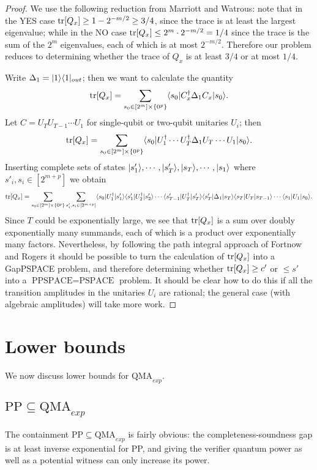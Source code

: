 \documentclass[english]{article}
\numberwithin{equation}{section}
\numberwithin{figure}{section}
\theoremstyle{plain}
\theoremstyle{definition}
\theoremstyle{plain}
\theoremstyle{definition}
\theoremstyle{remark}
\theoremstyle{remark}
\theoremstyle{plain}
\begin{document}
\begin{proof}
We use the following reduction from Marriott and Watrous: note that in the YES case $\operatorname{tr}[Q_x]\ge 1 - 2^{-m/2} \ge 3/4$, since the trace is at least the largest eigenvalue; while in the NO case $\operatorname{tr}[Q_x]\le 2^m \cdot 2^{-m/2} =1/4$ since the trace is the sum of the $2^m$ eigenvalues, each of which is at most $2^{-m/2}$. Therefore our problem reduces to determining whether the trace of $Q_x$ is at least $3/4$ or at most $1/4$.

Write $\Delta_1 = |1\rangle\langle 1|_{out}$; then we want to calculate the quantity
\begin{equation}
\operatorname{tr}[Q_x] = \sum_{s_0 \in [2^m] \times \{0^p\}} \langle s_0| C^\dagger_x \Delta_1 C_x |s_0\rangle.
\end{equation}
Let $C = U_TU_{T-1}\cdots U_1$ for single-qubit or two-qubit unitaries $U_i$; then
\begin{equation}
\operatorname{tr}[Q_x] = \sum_{s_0 \in [2^m] \times \{0^p\}} \langle s_0| U_1^\dagger \cdots U_T^\dagger \Delta_1 U_T\cdots U_1 |s_0\rangle.
\end{equation}
Inserting complete sets of states $|s'_1\rangle,\cdots,|s'_T\rangle,|s_T\rangle,\cdots,|s_1\rangle$ where $s'_i,s_i \in [2^{m+p}]$ we obtain
\begin{equation}
\operatorname{tr}[Q_x] = \sum_{s_0 \in [2^m] \times \{0^p\}} \sum_{s'_i,s_i \in [2^{m+p}]} \langle s_0| U_1^\dagger |s'_1\rangle\langle s'_1|U_2^\dagger|s'_2\rangle \cdots \langle s'_{T-1}|U_T^\dagger|s'_T\rangle \langle s'_T|\Delta_1 |s_T\rangle\langle s_T|U_T|s_{T-1}\rangle\cdots \langle s_1|U_1 |s_0\rangle.
\end{equation}
Since $T$ could be exponentially large, we see that $\operatorname{tr}[Q_x]$ is a sum over doubly exponentially many summands, each of which is a product over exponentially many factors. Nevertheless, by following the path integral approach of Fortnow and Rogers it should be possible to turn the calculation of $\operatorname{tr}[Q_x]$ into a GapPSPACE problem, and therefore determining whether $\operatorname{tr}[Q_x] \ge c'$ or $\le s'$ into a $\text{PPSPACE} = \text{PSPACE}$ problem. It should be clear how to do this if all the transition amplitudes in the unitaries $U_i$ are rational; the general case (with algebraic amplitudes) will take more work.

\end{proof}

\section{Lower bounds}
We now discuss lower bounds for $\text{QMA}_{exp}$.
\subsection{$\text{PP}\subseteq \text{QMA}_{exp}$}
The containment $\text{PP}\subseteq \text{QMA}_{exp}$ is fairly obvious: the completeness-soundness gap is at least inverse exponential for PP, and giving the verifier quantum power as well as a potential witness can only increase its power.
\end{document}
